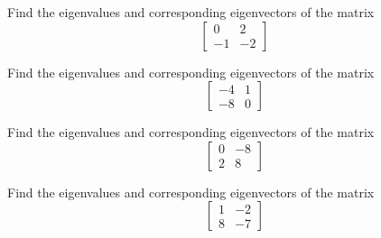 \begin{exercise}\ansMark%
Find the eigenvalues and corresponding eigenvectors of the matrix 
\[ \begin{bmatrix} 0 & 2 \\ -1 & -2 \end{bmatrix} \]
\end{exercise}

\begin{exercise}\ansMark%
Find the eigenvalues and corresponding eigenvectors of the matrix 
\[ \begin{bmatrix} -4 & 1 \\ -8 & 0 \end{bmatrix} \]
\end{exercise}

\begin{exercise}\ansMark%
Find the eigenvalues and corresponding eigenvectors of the matrix 
\[ \begin{bmatrix} 0 & -8 \\ 2 & 8 \end{bmatrix} \]
\end{exercise}

\begin{exercise}\ansMark%
Find the eigenvalues and corresponding eigenvectors of the matrix 
\[ \begin{bmatrix} 1 & -2 \\ 8 & -7 \end{bmatrix} \]
\end{exercise}

